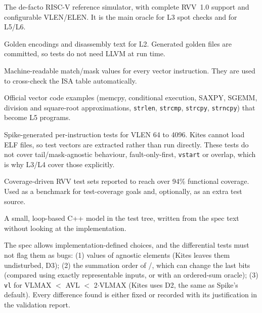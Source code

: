 \documentclass[11pt]{article}
\begin{document}
\begin{description}[style=nextline,leftmargin=0.6cm,font=\sffamily\bfseries\color{kblue}]
\item[Spike (riscv-isa-sim)~\cite{spike}] The de-facto RISC-V reference simulator, with complete
  RVV~1.0 support and configurable VLEN/ELEN. It is the main oracle for L3 spot checks and for L5/L6.
\item[LLVM MC~\cite{llvm} and GNU binutils] Golden encodings and disassembly text for L2. Generated
  golden files are committed, so tests do not need LLVM at run time.
\item[riscv-opcodes~\cite{opcodes}] Machine-readable match/mask values for every vector instruction.
  They are used to cross-check the ISA table automatically.
\item[Spec Appendix B~\cite{specex}] Official vector code examples (memcpy, conditional execution,
  SAXPY, SGEMM, division and square-root approximations, \texttt{strlen}, \texttt{strcmp},
  \texttt{strcpy}, \texttt{strncpy}) that become L5 programs.
\item[riscv-vector-tests~\cite{rvvtests}] Spike-generated per-instruction tests for VLEN 64 to 4096. Kites
  cannot load ELF files, so test vectors are extracted rather than run directly. These tests do not
  cover tail/mask-agnostic behaviour, fault-only-first, \texttt{vstart} or overlap, which is why L3/L4
  cover those explicitly.
\item[RVVTS~\cite{rvvts}] Coverage-driven RVV test sets reported to reach over 94\% functional
  coverage. Used as a benchmark for test-coverage goals and, optionally, as an extra test source.
\item[Independent reference model] A small, loop-based C++ model in the test tree, written from the
  spec text without looking at the implementation.
\end{description}

\begin{notebox}[title=Known legitimate differences from Spike]
The spec allows implementation-defined choices, and the differential tests must not flag them as
bugs: (1) values of agnostic elements (Kites leaves them undisturbed, D3); (2) the summation order of
/, which can change the last bits (compared using exactly
representable inputs, or with an ordered-sum oracle); (3) \texttt{vl} for
VLMAX $<$ AVL $<$ 2$\cdot$VLMAX (Kites uses D2, the same as Spike's default). Every difference
found is either fixed or recorded with its justification in the validation report.
\end{notebox}
\end{document}
